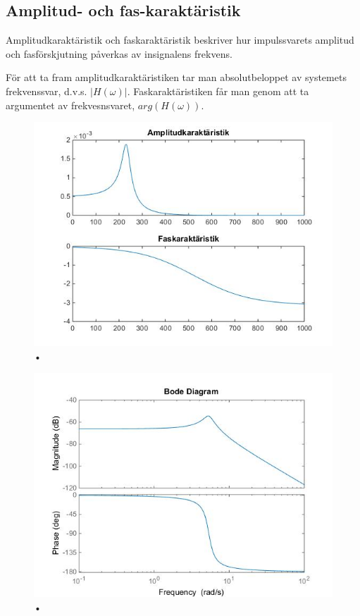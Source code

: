 \documentclass[10pt,a4paper]{article}
\begin{document}
\newpage

\subsection{Amplitud- och fas-karaktäristik}

Amplitudkaraktäristik och faskaraktäristik beskriver hur impulssvarets amplitud och fasförskjutning påverkas av insignalens frekvens.

För att ta fram amplitudkaraktäristiken tar man absolutbeloppet av systemets frekvenssvar, d.v.s. $|H(\omega)|$. Faskaraktäristiken får man genom att ta argumentet av frekvesnsvaret, $arg(H(\omega))$. 

\begin{figure}[h]
\begin{center}
\includegraphics[scale=0.5]{FasAmpKar}
\caption{•}
\end{center}
\end{figure}



\begin{figure}[h]
\begin{center}
\includegraphics[scale=0.5]{BodePlot(FasAmpKar)}
\caption{•}
\end{center}
\end{figure}
\end{document}
